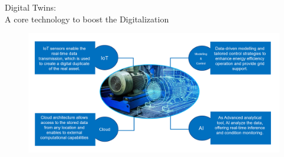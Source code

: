 \documentclass[aspectratio=169,hyperref={pdfpagelabels=false}]{beamer}
\begin{document}
\begin{frame}{Digital Twins: \\ \vspace{0.5em}
  \normalsize{A core technology to boost the Digitalization}}
\begin{figure}[h]
  \vspace{1em}
\includegraphics[width=1.05\textwidth]{img/pic7.png} \centering
\end{figure}
\end{frame}
\end{document}
